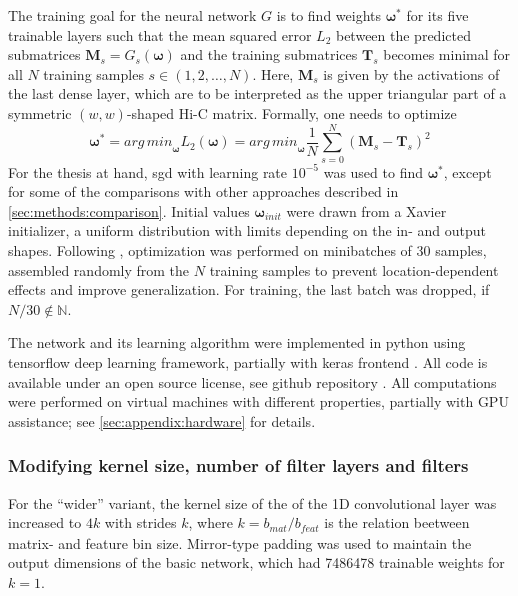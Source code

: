 The training goal for the neural network $G$ is to find weights $\bm{\omega}^*$ for its five trainable layers 
such that the mean squared error $L_2$ between the predicted submatrices $\mathbf{M}_s = G_s(\bm{\omega})$ 
and the training submatrices $\mathbf{T}_s$ becomes minimal for all $N$ training samples $s \in (1,2,\dots, N)$. 
Here, $\mathbf{M}_s$ is given by the activations of the last dense layer, which are to be interpreted as the upper triangular 
part of a symmetric $(w, w)$-shaped Hi-C matrix.
Formally, one needs to optimize
\begin{equation}
 \bm{\omega}^* = \mathit{arg\,min}_{\bm{\omega}} L_2(\bm{\omega}) = 
        \mathit{arg\,min}_{\bm{\omega}} \frac{1}{N} \sum_{s=0}^N (\mathbf{M}_s - \mathbf{T}_s)^2 \label{eq:methods:nn-mse}
\end{equation} 
For the thesis at hand, \acrfull{sgd} with learning rate $10^{-5}$  was used to find $\bm{\omega}^*$,
except for some of the comparisons with other approaches described in \cref{sec:methods:comparison}.
Initial values $\bm{\omega}_\mathit{init}$ were drawn from a Xavier initializer, a uniform distribution with limits depending on the in- and output shapes.
Following \cite{Farre2018a}, optimization was performed on minibatches of 30 samples, assembled randomly from the $N$ training samples
to prevent location-dependent effects and improve generalization.
For training, the last batch was dropped, if $N/30 \not \in \mathbb{N}$. 

The network and its learning algorithm were implemented in python using tensorflow deep learning framework, partially with keras frontend \cite{Abadi2015,Chollet2015}.
All code is available under an open source license, see github repository \cite{Krauth2021b}. 
All computations were performed on virtual machines with different properties, partially with GPU assistance; see \ref{sec:appendix:hardware} for details.

\subsubsection{Modifying kernel size, number of filter layers and filters} \label{sec:methods:variants}
For the ``wider'' variant, the kernel size of the of the 1D convolutional layer was increased to $4k$ with strides $k$,
where $k=b_\mathit{mat}/b_\mathit{feat}$ is the relation beetween matrix- and feature bin size.
Mirror-type padding was used to maintain the output dimensions of the basic network, which had \SI{7486478}{} trainable weights
for $k=1$.

